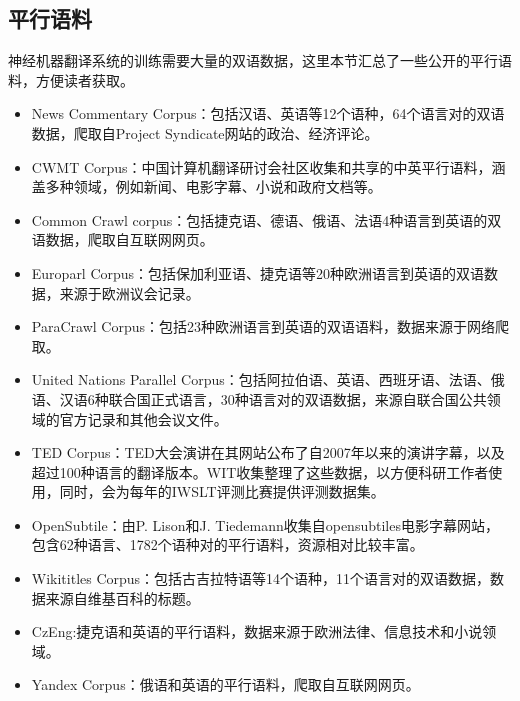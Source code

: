 \begin{appendices}
\section{平行语料}
\parinterval 神经机器翻译系统的训练需要大量的双语数据，这里本节汇总了一些公开的平行语料，方便读者获取。
\vspace{0.5em}
\begin{itemize}
\item News Commentary Corpus：包括汉语、英语等12个语种，64个语言对的双语数据，爬取自Project Syndicate网站的政治、经济评论。
\vspace{0.5em}
\item CWMT Corpus：中国计算机翻译研讨会社区收集和共享的中英平行语料，涵盖多种领域，例如新闻、电影字幕、小说和政府文档等。
\vspace{0.5em}
\item Common Crawl corpus：包括捷克语、德语、俄语、法语4种语言到英语的双语数据，爬取自互联网网页。
\vspace{0.5em}
\item Europarl Corpus：包括保加利亚语、捷克语等20种欧洲语言到英语的双语数据，来源于欧洲议会记录。
\vspace{0.5em}
\item ParaCrawl Corpus：包括23种欧洲语言到英语的双语语料，数据来源于网络爬取。
\vspace{0.5em}
\item United Nations Parallel Corpus：包括阿拉伯语、英语、西班牙语、法语、俄语、汉语6种联合国正式语言，30种语言对的双语数据，来源自联合国公共领域的官方记录和其他会议文件。
\vspace{0.5em}
\item TED Corpus：TED大会演讲在其网站公布了自2007年以来的演讲字幕，以及超过100种语言的翻译版本。WIT收集整理了这些数据，以方便科研工作者使用，同时，会为每年的IWSLT评测比赛提供评测数据集。
\vspace{0.5em}
\item OpenSubtile：由P. Lison和J. Tiedemann收集自opensubtiles电影字幕网站，包含62种语言、1782个语种对的平行语料，资源相对比较丰富。
\vspace{0.5em}
\item Wikititles Corpus：包括古吉拉特语等14个语种，11个语言对的双语数据，数据来源自维基百科的标题。
\vspace{0.5em}
\item CzEng:捷克语和英语的平行语料，数据来源于欧洲法律、信息技术和小说领域。
\vspace{0.5em}
\item Yandex Corpus：俄语和英语的平行语料，爬取自互联网网页。

\end{itemize}
\end{appendices}
